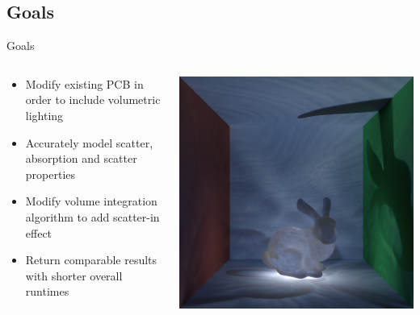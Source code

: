 \documentclass[10pt,handout,compress,professionalfont]{beamer}
\begin{document}
\subsection{Goals}
\begin{frame}{Goals}

    \begin{columns}
        \begin{column}{0.5\textwidth}

            \vspace{-4mm}
            \begin{itemize}
                \item Modify existing PCB in order to include volumetric lighting\\ \vspace{2mm}
                \item Accurately model scatter, absorption and scatter properties\\ \vspace{2mm}
                \item Modify volume integration algorithm to add scatter-in effect\\ \vspace{2mm}
                \item Return comparable results with shorter overall runtimes
            \end{itemize}
        \end{column}
        \begin{column}{0.5\textwidth}
            \includegraphics[width=\textwidth]{../img/bunny_glow}
        \end{column}
    \end{columns}

\end{frame}
\end{document}
